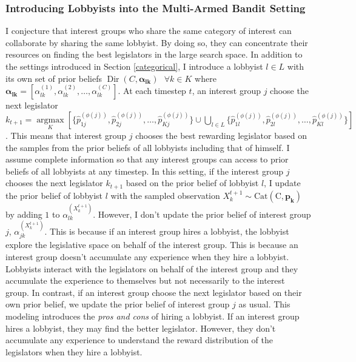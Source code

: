 \documentclass{article}
\begin{document}
\subsubsection{\normalsize{Introducing Lobbyists into the Multi-Armed Bandit Setting}}\label{arml}
I conjecture 
that interest groups who share the same category of interest
can collaborate by sharing the same lobbyist. 
By doing so, they can concentrate their resources on finding the best legislators in the large search space.
In addition to the settings introduced in Section \ref{categorical},
I introduce a lobbyist $l \in L$ with its own set 
of prior beliefs $\operatorname{Dir}(C, \mathbf{\alpha_{lk}}) \text{ } \forall k \in K$ 
where $\mathbf{\alpha_{lk}} = [\alpha_{lk}^{(1)}, \alpha_{lk}^{(2)}, \hdots, \alpha_{lk}^{(C)}]$.
At each timestep $t$,
an interest group $j$ choose 
the next legislator $k_{t+1} = \underset{K}{\operatorname{argmax}}\left[\{\hat{p}^{(\phi(j))}_{1j}, \hat{p}^{(\phi(j))}_{2j}, \hdots, \hat{p}^{(\phi(j))}_{Kj}\}\cup\bigcup_{l\in L}\{\hat{p}^{(\phi(j))}_{1l}, \hat{p}^{(\phi(j))}_{2l}, \hdots, \hat{p}^{(\phi(j))}_{Kl}\}\right]$. 
This means that 
interest group $j$ chooses the best rewarding legislator based on the samples from the prior beliefs of all lobbyists including that of himself.
I assume complete information so that 
any interest groups can 
access to prior beliefs of all lobbyists at any timestep. 
In this setting, 
if the interest group $j$ 
chooses the next legislator $k_{t+1}$ 
based on 
the prior belief of lobbyist $l$, 
I update the prior belief of lobbyist 
$l$ with the sampled observation $X_{k}^{t+1} \sim \operatorname{Cat(C, \mathbf{p_k})}$
by adding $1$ to $\alpha_{lk}^{(X_k^{t+1})}$.
However, 
I don't update the 
prior belief of interest group $j$, $\alpha_{jk}^{(X_k^{t+1})}$.
This is because
if an interest group hires a lobbyist,
the lobbyist explore the legislative space on behalf of the interest group. 
This is because an interest group 
doesn't accumulate any experience when they hire a lobbyist.
Lobbyists interact with the legislators on behalf 
of the interest group and they accumulate the experience 
to themselves but not necessarily to the interest group.
In contrast, 
if an interest group choose the next legislator 
based on their own prior belief,
we update the prior belief of interest group $j$ as usual.
This modeling introduces the \textit{pros and cons} of hiring a lobbyist.
If an interest group hires a lobbyist, they 
may find the better legislator. However, 
they don't accumulate any experience to understand the reward distribution of the legislators
when they hire a lobbyist.
\end{document}
